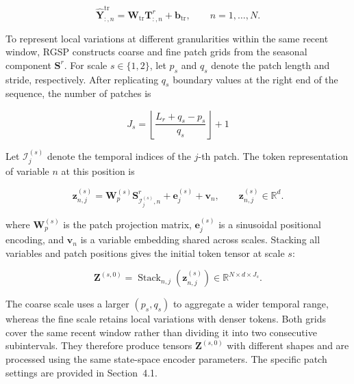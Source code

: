 \begin{equation}
\widehat{\mathbf{Y}}^{\mathrm{tr}}_{:,n}
=\mathbf{W}_{\mathrm{tr}}\mathbf{T}^{r}_{:,n}
+\mathbf{b}_{\mathrm{tr}},
\qquad n=1,\ldots,N.
\label{eq:trend-projection}
\end{equation}

To represent local variations at different granularities within the same recent window, RGSP constructs coarse and fine patch grids from the seasonal component \(\mathbf{S}^{r}\). For scale \(s\in\{1,2\}\), let \(p_s\) and \(q_s\) denote the patch length and stride, respectively. After replicating \(q_s\) boundary values at the right end of the sequence, the number of patches is

\begin{equation}
J_s=\left\lfloor\frac{L_r+q_s-p_s}{q_s}\right\rfloor+1
\label{eq:patch-count}
\end{equation}

Let \(\mathcal{I}^{(s)}_j\) denote the temporal indices of the \(j\)-th patch. The token representation of variable \(n\) at this position is

\begin{equation}
\mathbf{z}^{(s)}_{n,j}
=\mathbf{W}^{(s)}_{p}\mathbf{S}^{r}_{\mathcal{I}^{(s)}_j,n}
+\mathbf{e}^{(s)}_{j}+\mathbf{v}_{n},
\qquad
\mathbf{z}^{(s)}_{n,j}\in\mathbb{R}^{d}.
\label{eq:patch-token}
\end{equation}

where \(\mathbf{W}^{(s)}_{p}\) is the patch projection matrix, \(\mathbf{e}^{(s)}_{j}\) is a sinusoidal positional encoding, and \(\mathbf{v}_{n}\) is a variable embedding shared across scales. Stacking all variables and patch positions gives the initial token tensor at scale \(s\):

\begin{equation}
\mathbf Z^{(s,0)}
=\operatorname{Stack}_{n,j}\!\left(\mathbf z^{(s)}_{n,j}\right)
\in\mathbb R^{N\times d\times J_s}.
\label{eq:scale-token-tensor}
\end{equation}

The coarse scale uses a larger \((p_s,q_s)\) to aggregate a wider temporal range, whereas the fine scale retains local variations with denser tokens. Both grids cover the same recent window rather than dividing it into two consecutive subintervals. They therefore produce tensors \(\mathbf Z^{(s,0)}\) with different shapes and are processed using the same state-space encoder parameters. The specific patch settings are provided in Section~4.1.

